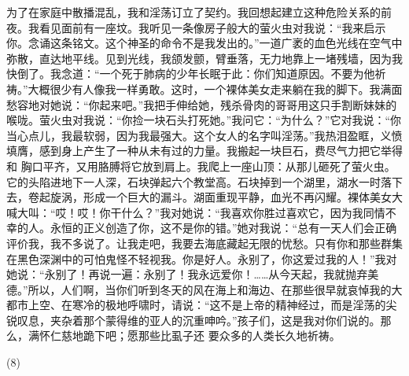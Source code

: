 \documentclass{article}
\begin{document}
为了在家庭中散播混乱，我和淫荡订立了契约。我回想起建立这种危险关系的前夜。我看见面前有一座坟。我听见一条像房子般大的萤火虫对我说：“我来启示你。念诵这条铭文。这个神圣的命令不是我发出的。”一道广袤的血色光线在空气中弥散，直达地平线。见到光线，我颌发颤，臂垂落，无力地靠上一堵残墙，因为我快倒了。我念道：“一个死于肺病的少年长眠于此：你们知道原因。不要为他祈祷。”大概很少有人像我一样勇敢。这时，一个裸体美女走来躺在我的脚下。我满面愁容地对她说：“你起来吧。”我把手伸给她，残杀骨肉的哥哥用这只手割断妹妹的喉咙。萤火虫对我说：“你捡一块石头打死她。”我问它：“为什么？”它对我说：“你当心点儿，我最软弱，因为我最强大。这个女人的名字叫淫荡。”我热泪盈眶，义愤填膺，感到身上产生了一种从未有过的力量。我搬起一块巨石，费尽气力把它举得和
\newpage
胸口平齐，又用胳膊将它放到肩上。我爬上一座山顶：从那儿砸死了萤火虫。它的头陷进地下一人深，石块弹起六个教堂高。石块掉到一个湖里，湖水一时落下去，卷起旋涡，形成一个巨大的漏斗。湖面重现平静，血光不再闪耀。裸体美女大喊大叫：“哎！哎！你干什么？”我对她说：“我喜欢你胜过喜欢它，因为我同情不幸的人。永恒的正义创造了你，这不是你的错。”她对我说：“总有一天人们会正确评价我，我不多说了。让我走吧，我要去海底藏起无限的忧愁。只有你和那些群集在黑色深渊中的可怕鬼怪不轻视我。你是好人。永别了，你这爱过我的人！”我对她说：“永别了！再说一遍：永别了！我永远爱你！……从今天起，我就抛弃美德。”所以，人们啊，当你们听到冬天的风在海上和海边、在那些很早就哀悼我的大都市上空、在寒冷的极地呼啸时，请说：“这不是上帝的精神经过，而是淫荡的尖锐叹息，夹杂着那个蒙得维的亚人的沉重呻吟。”孩子们，这是我对你们说的。那么，满怀仁慈地跪下吧；愿那些比虱子还
要众多的人类长久地祈祷。 


\newpage

(8) 
\end{document}
